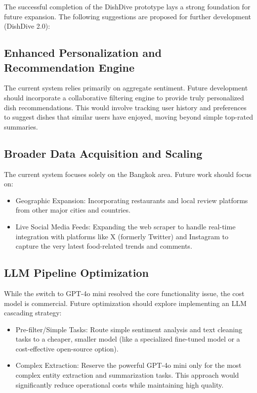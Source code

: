 The successful completion of the DishDive prototype lays a strong foundation for future expansion. The following suggestions are proposed for further development (DishDive 2.0):

\subsection{Enhanced Personalization and Recommendation Engine}

The current system relies primarily on aggregate sentiment. Future development should incorporate a collaborative filtering engine to provide truly personalized dish recommendations. This would involve tracking user history and preferences to suggest dishes that similar users have enjoyed, moving beyond simple top-rated summaries.

\subsection{Broader Data Acquisition and Scaling}

The current system focuses solely on the Bangkok area. Future work should focus on:
\begin{itemize}
	\item Geographic Expansion: Incorporating restaurants and local review platforms from other major cities and countries.
	\item Live Social Media Feeds: Expanding the web scraper to handle real-time integration with platforms like X (formerly Twitter) and Instagram to capture the very latest food-related trends and comments.
\end{itemize}

\subsection{LLM Pipeline Optimization}

While the switch to GPT-4o mini resolved the core functionality issue, the cost model is commercial. Future optimization should explore implementing an LLM cascading strategy:
\begin{itemize}
	\item Pre-filter/Simple Tasks: Route simple sentiment analysis and text cleaning tasks to a cheaper, smaller model (like a specialized fine-tuned model or a cost-effective open-source option).
	\item Complex Extraction: Reserve the powerful GPT-4o mini only for the most complex entity extraction and summarization tasks. This approach would significantly reduce operational costs while maintaining high quality.
\end{itemize}


\cleardoublepage
{}
\printbibliography[heading=bibintoc,title=References]
